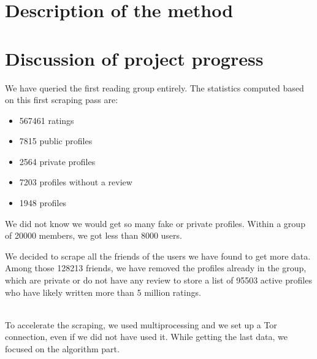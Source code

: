 \documentclass[11pt]{article}
\begin{document}
\section{Description of the method}


\section{Discussion of project progress}

We have queried the first reading group entirely.
The statistics computed based on this first scraping pass are:
\begin{itemize}
\item 567461 ratings
\item 7815 public profiles
\item 2564 private profiles
\item 7203 profiles without a review
\item 1948 profiles 
\end{itemize}

We did not know we would get so many fake or private profiles. Within a group of 20000 members, we got less than 8000 users.

We decided to scrape all the friends of the users we have found to get more data. 
Among those 128213 friends, we have removed the profiles already in the group, which are private or do not have any review to store a list of 95503 active profiles who have likely written more than 5 million ratings.

\\
To accelerate the scraping, we used multiprocessing and we set up a Tor connection, even if we did not have used it. 
While getting the last data, we focused on the algorithm part.




\end{document}
